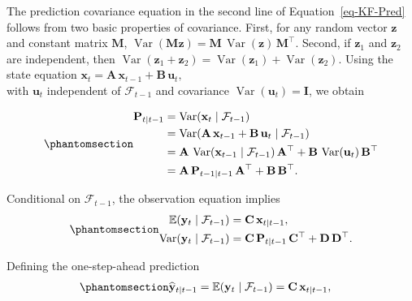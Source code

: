\documentclass[
  letterpaper,
  DIV=11,
  numbers=noendperiod]{scrreprt}
\begin{document}
The prediction covariance equation in the second line of
Equation~\ref{eq-KF-Pred} follows from two basic properties of
covariance. First, for any random vector \(\mathbf{z}\) and constant
matrix \(\mathbf{M}\),
\(\operatorname{Var}(\mathbf{M}\mathbf{z})  = \mathbf{M}\,\operatorname{Var}(\mathbf{z})\,\mathbf{M}^\top.\)
Second, if \(\mathbf{z}_1\) and \(\mathbf{z}_2\) are independent, then
\(\operatorname{Var}(\mathbf{z}_1 + \mathbf{z}_2)
  = \operatorname{Var}(\mathbf{z}_1) + \operatorname{Var}(\mathbf{z}_2).\)
Using the state equation
\(\mathbf{x}_t = \mathbf{A}\,\mathbf{x}_{t-1} + \mathbf{B}\,\mathbf{u}_t,\)\\
with \(\mathbf{u}_t\) independent of \(\mathcal{F}_{t-1}\) and
covariance \(\operatorname{Var}(\mathbf{u}_t) = \mathbf{I}\), we obtain

\begin{equation}\protect\phantomsection\label{eq-gen-0112}{
\begin{align}
  \mathbf{P}_{t\mid t-1}
  &= \operatorname{Var}(\mathbf{x}_t \mid \mathcal{F}_{t-1}) \\
  &= \operatorname{Var}(\mathbf{A}\,\mathbf{x}_{t-1}
       + \mathbf{B}\,\mathbf{u}_t \mid \mathcal{F}_{t-1}) \\
  &= \mathbf{A}\,\operatorname{Var}(\mathbf{x}_{t-1} \mid \mathcal{F}_{t-1})\,\mathbf{A}^\top
     + \mathbf{B}\,\operatorname{Var}(\mathbf{u}_t)\,\mathbf{B}^\top \\
  &= \mathbf{A}\,\mathbf{P}_{t-1\mid t-1}\,\mathbf{A}^\top
     + \mathbf{B}\,\mathbf{B}^\top.
\end{align}
}\end{equation}

Conditional on \(\mathcal{F}_{t-1}\), the observation equation implies
\begin{equation}\protect\phantomsection\label{eq-gen-0113}{
\begin{align}
  \mathbb{E}(\mathbf{y}_t \mid \mathcal{F}_{t-1})
    &= \mathbf{C}\,\mathbf{x}_{t\mid t-1}, \\
  \operatorname{Var}(\mathbf{y}_t \mid \mathcal{F}_{t-1})
    &= \mathbf{C}\,\mathbf{P}_{t\mid t-1}\,\mathbf{C}^\top
       + \mathbf{D}\,\mathbf{D}^\top.
\end{align}
}\end{equation}

Defining the one-step-ahead prediction
\begin{equation}\protect\phantomsection\label{eq-gen-0114}{
\begin{align}
  \widehat{\mathbf{y}}_{t\mid t-1}
    &= \mathbb{E}(\mathbf{y}_t \mid \mathcal{F}_{t-1})
     = \mathbf{C}\,\mathbf{x}_{t\mid t-1},
\end{align}
}\end{equation}
\end{document}
